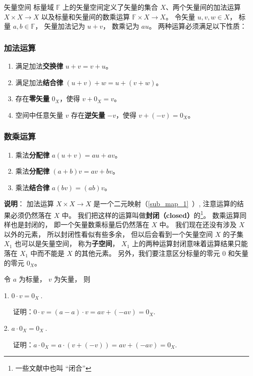 \begin{definition}{矢量空间}
标量域 $\mathbb F$ 上的矢量空间定义了矢量的集合 $X$、两个矢量间的加法运算 $X\times X \to X$ 以及标量和矢量间的数乘运算 $\mathbb F \times X \to X$。 令矢量 $u,v,w \in X$， 标量 $a,b \in \mathbb F$， 矢量加法记为 $u + v$， 数乘记为 $a u$。 两种运算必须满足以下性质：

\subsubsection{加法运算}
\begin{enumerate}
\item 满足加法\textbf{交换律} $u + v = v + u$。
\item 满足加法\textbf{结合律} $(u + v) + w = u + (v + w)$。
\item 存在\textbf{零矢量} $0_X$，使得 $v + 0_X = v$。
\item 空间中任意矢量 $v$ 存在\textbf{逆矢量} $-v$，使得 $v + (-v) = 0_X$。
\end{enumerate}

\subsubsection{数乘运算}
\begin{enumerate}
\item 乘法\textbf{分配律} $a(u + v) = au + av$。
\item 乘法\textbf{分配律} $(a + b)v = av + bv$。
\item 乘法\textbf{结合律} $a (b v) = (ab) v$。
\end{enumerate}
\end{definition}

\textbf{说明}： 加法运算 $X \times X \to X$ 是一个二元映射（\autoref{sub_map_1}~）, 注意运算的结果必须仍然落在 $X$ 中。 我们把这样的运算叫做\textbf{封闭（closed）}的\footnote{一些文献中也叫 “闭合”}。 数乘运算同样也是封闭的， 即一个矢量数乘标量后仍然落在 $X$ 中。 我们现在还没有涉及 $X$ 以外的元素， 所以封闭性看似有些多余， 但以后会看到一个矢量空间 $X$ 的子集 $X_1$ 也可以是矢量空间， 称为\textbf{子空间}， $X_1$ 上的两种运算封闭意味着运算结果只能落在 $X_1$ 中而不能是 $X$ 的其他元素。 另外，我们要注意区分标量的零元 $0$ 和矢量的零元 $0_X$。

\begin{corollary}{}
令 $a$ 为标量， $v$ 为矢量， 则

1. $0\cdot v=0_X~.$

$\quad$ 证明：$0\cdot v=(a-a)\cdot v=av+(-av)=0_X$.

2. $a \cdot 0_X=0_X~.$

$\quad$ 证明：$a \cdot 0_X=a\cdot(v+(-v))=av+(-av)=0_X$.

\end{corollary}

